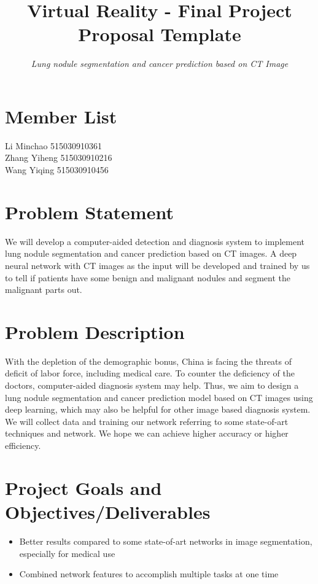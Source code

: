 \documentclass[hyperref]{article}
\theoremstyle{nonumberplain}
\begin{document}
\title{\bf Virtual Reality - Final Project Proposal Template} 
\author{\textit{Lung nodule segmentation and cancer prediction based on CT Image}}
\maketitle

\section{Member List}
{\noindent \large{Li Minchao \hspace{1.65cm}515030910361}\\}
{\noindent \large{\hspace{1cm} Zhang Yiheng \hspace{1.03cm} 515030910216}\\}
{\noindent \large{\hspace{1cm} Wang Yiqing  \hspace{1.2cm} 515030910456}}
\section{Problem Statement}
We will develop a computer-aided detection and diagnosis system to implement lung nodule segmentation and cancer prediction based on CT images. A deep neural network with CT images as the input will be developed and trained by us to tell if patients have some benign and malignant nodules and segment the malignant parts out.

\section{Problem Description}
With the depletion of the demographic bonus, China is facing the threats of deficit of labor force, including medical care. To counter the deficiency of the doctors, computer-aided diagnosis system may help. Thus, we aim to design a lung nodule segmentation and cancer prediction model based on CT images using deep learning, which may also be helpful for other image based diagnosis system. We will collect data and training our network referring to some state-of-art techniques and network. We hope we can achieve higher accuracy or higher efficiency.

\section{Project Goals and Objectives/Deliverables}
\begin{itemize}
	\item Better results compared to some state-of-art networks in image segmentation, especially for medical use
	\item Combined network features to accomplish multiple tasks at one time
\end{itemize}
\end{document}
